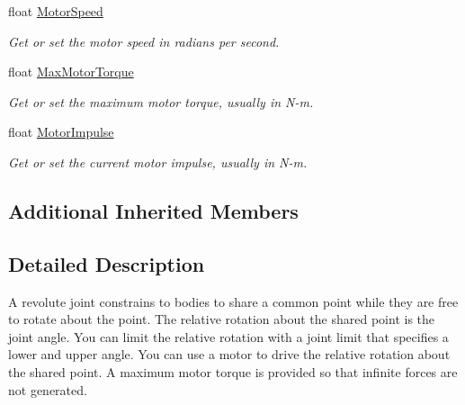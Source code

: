 \begin{DoxyCompactItemize}
float \hyperlink{class_farseer_physics_1_1_dynamics_1_1_joints_1_1_revolute_joint_aaccf23cc3f7d91fbb41ae72cb2471566}{Motor\+Speed}
\begin{DoxyCompactList}\small\item\em Get or set the motor speed in radians per second. \end{DoxyCompactList}\item 
float \hyperlink{class_farseer_physics_1_1_dynamics_1_1_joints_1_1_revolute_joint_a68c0f56642704ec1a93e960d62e3e369}{Max\+Motor\+Torque}
\begin{DoxyCompactList}\small\item\em Get or set the maximum motor torque, usually in N-\/m. \end{DoxyCompactList}\item 
float \hyperlink{class_farseer_physics_1_1_dynamics_1_1_joints_1_1_revolute_joint_aa7a108f318d3a42bfb1095276f15a082}{Motor\+Impulse}
\begin{DoxyCompactList}\small\item\em Get or set the current motor impulse, usually in N-\/m. \end{DoxyCompactList}\end{DoxyCompactItemize}
\subsection*{Additional Inherited Members}


\subsection{Detailed Description}
A revolute joint constrains to bodies to share a common point while they are free to rotate about the point. The relative rotation about the shared point is the joint angle. You can limit the relative rotation with a joint limit that specifies a lower and upper angle. You can use a motor to drive the relative rotation about the shared point. A maximum motor torque is provided so that infinite forces are not generated. 



